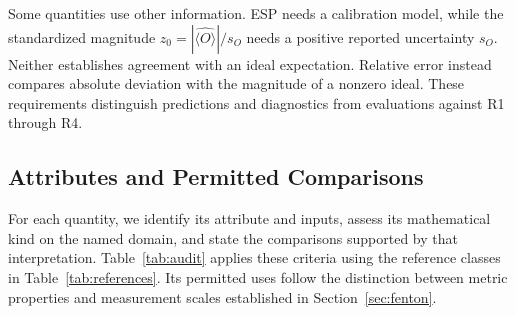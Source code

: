 \documentclass[10pt,conference]{IEEEtran}
\begin{document}
Some quantities use other information. ESP needs a calibration model, while the standardized magnitude $z_0=|\widehat{\langle O\rangle}|/s_O$ needs a positive reported uncertainty $s_O$. Neither establishes agreement with an ideal expectation. Relative error instead compares absolute deviation with the magnitude of a nonzero ideal. These requirements distinguish predictions and diagnostics from evaluations against R1 through R4.

\subsection{Attributes and Permitted Comparisons}
\label{sec:classification}

For each quantity, we identify its attribute and inputs, assess its mathematical kind on the named domain, and state the comparisons supported by that interpretation. Table~\ref{tab:audit} applies these criteria using the reference classes in Table~\ref{tab:references}. Its permitted uses follow the distinction between metric properties and measurement scales established in Section~\ref{sec:fenton}.
\end{document}
